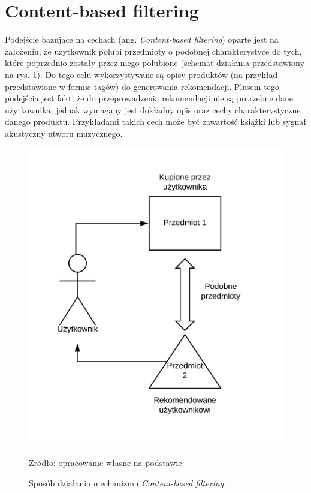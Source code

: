 \section{Content-based filtering}
Podejście bazujące na cechach (ang. \textit{Content-based filtering}) oparte jest na założeniu, że użytkownik polubi przedmioty o podobnej charakterystyce do tych, które poprzednio zostały przez niego polubione (schemat działania przedstawiony na rys. \ref{fig:content-based}). Do tego celu wykorzystywane są opisy produktów (na przykład przedstawione w formie tagów) do generowania rekomendacji. Plusem tego podejścia jest fakt, że do przeprowadzenia rekomendacji nie są potrzebne dane użytkownika, jednak wymagany jest dokładny opis oraz cechy charakterystyczne danego produktu. Przykładami takich cech może być zawartość książki lub sygnał akustyczny utworu muzycznego.

\begin{figure}[h]
    \centering
    \includegraphics[scale=0.7]{images/content-based.png}
    \caption{Sposób działania mechanizmu \textit{Content-based filtering}.}
    Źródło: opracowanie własne na podstawie \cite{challenges_solutions_survey}
    \label{fig:content-based}
\end{figure}

